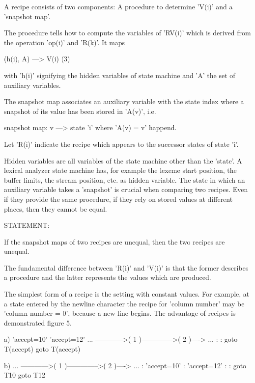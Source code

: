 \documentclass[12pt]{article}
\begin{document}
   A recipe consists of two components: A procedure to determine 'V(i)' and a
   'snapshot map'. 
   
   The procedure tells how to compute the variables of 'RV(i)' which is derived
   from the operation 'op(i)' and 'R(k)'.  It maps

        (h(i), A) ---> V(i)                                             (3)

   with 'h(i)' signifying the hidden variables of state machine and 'A' the
   set of auxiliary variables. 
   
   The snapshot map associates an auxiliary variable with the state index
   where a snapshot of its value has been stored in 'A(v)', i.e.
   
        snapshot map:  v ---> state 'i' where 'A(v) = v' happend.
   
   Let 'R(i)' indicate the recipe which appears to the successor states of
   state 'i'.

Hidden variables are all variables of the state machine other than the 'state'.
A lexical analyzer state machine has, for example the lexeme start position,
the buffer limits, the stream position, etc. as hidden variable. The state
in which an auxiliary variable takes a 'snapshot' is crucial when comparing
two recipes. Even if they provide the same procedure, if they rely on stored
values at different places, then they cannot be equal.

STATEMENT:

   If the snapshot maps of two recipes are unequal, then the two recipes
   are unequal.

The fundamental difference between 'R(i)' and 'V(i)' is that the former describes
a procedure and the latter represents the values which are produced.

The simplest form of a recipe is the setting with constant values.  For
example, at a state entered by the newline character the recipe for 'column
number' may be 'column number = 0', because a new line begins. The advantage of
recipes is demonstrated figure 5.


    a)        
            'accept=10'        'accept=12'        
       ... ------------>( 1 )-------------->( 2 )----> ...
                          :                   :
                    goto T(accept)      goto T(accept)

    b) 
       ... ------------>( 1 )-------------->( 2 )----> ...
                          : 'accept=10'       : 'accept=12'              
                          :                   :
                      goto T10            goto T12
\end{document}
